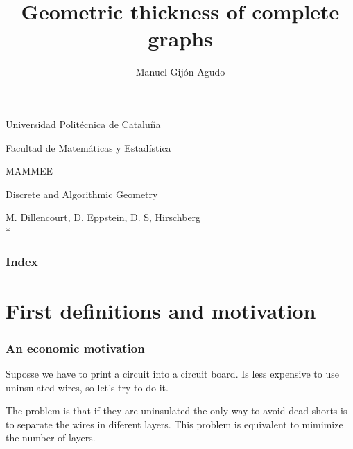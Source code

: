 \documentclass[12 pt]{beamer}
\title{Geometric thickness of complete graphs}
\author{\normalsize{Manuel Gijón Agudo}}
\date{}
\begin{document}


\begin{frame}[plain]
    \begin{center}

        Universidad Politécnica de Cataluña
        
        Facultad de Matemáticas y Estadística
        
        MAMMEE
        
        \scriptsize{Discrete and Algorithmic Geometry}
        
        \maketitle    
        M. Dillencourt, D. Eppstein, D. S, Hirschberg\\*
        
        \small{}
    \end{center}
    
    
\end{frame}



\begin{frame}{0}

    \frametitle{Index}
     
    \tableofcontents  %
\end{frame}

\section{First definitions and motivation}

\begin{frame}{1}
    \frametitle{An economic motivation}
    Suposse we have to print a circuit into a circuit board. Is less expensive to use uninsulated wires, so let's try to do it.
    
    \pause
    
    The problem is that if they are uninsulated the only way to avoid dead shorts is to separate the wires in diferent layers. This problem is equivalent to mimimize the number of layers.
    
\end{frame}
\end{document}
